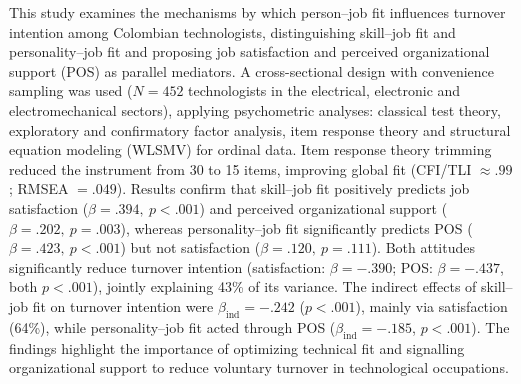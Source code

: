 \begin{secondaryabstract}
This study examines the mechanisms by which person--job fit influences turnover intention among Colombian technologists, distinguishing skill--job fit and personality--job fit and proposing job satisfaction and perceived organizational support (POS) as parallel mediators. A cross-sectional design with convenience sampling was used (\(N=452\) technologists in the electrical, electronic and electromechanical sectors), applying psychometric analyses: classical test theory, exploratory and confirmatory factor analysis, item response theory and structural equation modeling (WLSMV) for ordinal data. Item response theory trimming reduced the instrument from 30 to 15 items, improving global fit (CFI/TLI \(\approx .99\); RMSEA \(= .049\)). Results confirm that skill--job fit positively predicts job satisfaction (\(\beta=.394,\ p<.001\)) and perceived organizational support (\(\beta=.202,\ p=.003\)), whereas personality--job fit significantly predicts POS (\(\beta=.423,\ p<.001\)) but not satisfaction (\(\beta=.120,\ p=.111\)). Both attitudes significantly reduce turnover intention (satisfaction: \(\beta=-.390\); POS: \(\beta=-.437\), both \(p<.001\)), jointly explaining 43\% of its variance. The indirect effects of skill--job fit on turnover intention were \(\beta_{\text{ind}}=-.242\) (\(p<.001\)), mainly via satisfaction (64\%), while personality--job fit acted through POS (\(\beta_{\text{ind}}=-.185\), \(p<.001\)). The findings highlight the importance of optimizing technical fit and signalling organizational support to reduce voluntary turnover in technological occupations.
\end{secondaryabstract}
